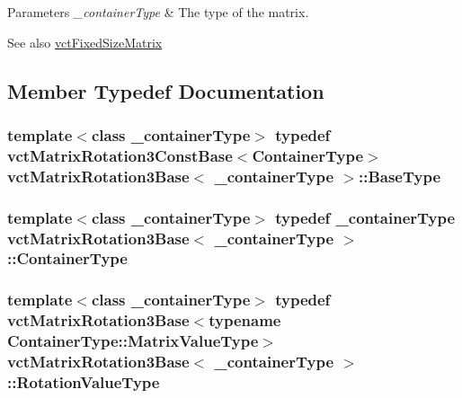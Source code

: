 \begin{DoxyParams}{Parameters}
{\em \+\_\+container\+Type} & The type of the matrix.\\
\hline
\end{DoxyParams}
\begin{DoxySeeAlso}{See also}
\hyperlink{classvct_fixed_size_matrix}{vct\+Fixed\+Size\+Matrix} 
\end{DoxySeeAlso}


\subsection{Member Typedef Documentation}
\hypertarget{classvct_matrix_rotation3_base_a81e215f535ce137435cbafdcb0f3b6f1}{}
\subsubsection[{Base\+Type}]{\setlength{\rightskip}{0pt plus 5cm}template$<$class \+\_\+container\+Type$>$ typedef {\bf vct\+Matrix\+Rotation3\+Const\+Base}$<${\bf Container\+Type}$>$ {\bf vct\+Matrix\+Rotation3\+Base}$<$ \+\_\+container\+Type $>$\+::{\bf Base\+Type}}\label{classvct_matrix_rotation3_base_a81e215f535ce137435cbafdcb0f3b6f1}
\hypertarget{classvct_matrix_rotation3_base_ac6181bbfdbc84777f613a0bc5a6bc75a}{}
\subsubsection[{Container\+Type}]{\setlength{\rightskip}{0pt plus 5cm}template$<$class \+\_\+container\+Type$>$ typedef \+\_\+container\+Type {\bf vct\+Matrix\+Rotation3\+Base}$<$ \+\_\+container\+Type $>$\+::{\bf Container\+Type}}\label{classvct_matrix_rotation3_base_ac6181bbfdbc84777f613a0bc5a6bc75a}
\hypertarget{classvct_matrix_rotation3_base_a9cac9a0141e6b59fe9185b1121f70229}{}
\subsubsection[{Rotation\+Value\+Type}]{\setlength{\rightskip}{0pt plus 5cm}template$<$class \+\_\+container\+Type$>$ typedef {\bf vct\+Matrix\+Rotation3\+Base}$<$typename Container\+Type\+::\+Matrix\+Value\+Type$>$ {\bf vct\+Matrix\+Rotation3\+Base}$<$ \+\_\+container\+Type $>$\+::{\bf Rotation\+Value\+Type}}\label{classvct_matrix_rotation3_base_a9cac9a0141e6b59fe9185b1121f70229}
\hypertarget{classvct_matrix_rotation3_base_a027be766cb10ca3c2ad8e85c28ed0af9}{}

